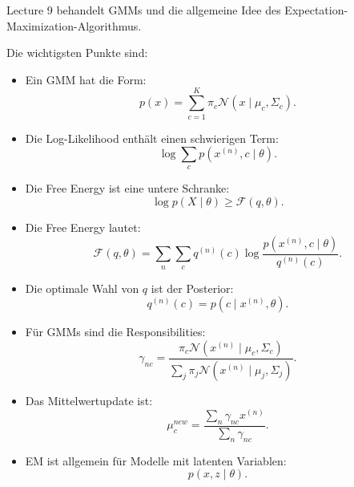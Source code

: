 \documentclass[11pt,a4paper]{scrartcl}
\begin{document}
\begin{answerbox}
    Lecture 9 behandelt GMMs und die allgemeine Idee des
    Expectation-Maximization-Algorithmus.

    Die wichtigsten Punkte sind:

    \begin{itemize}
        \item Ein GMM hat die Form:
        \[
            p(x)
            =
            \sum_{c=1}^{K}
            \pi_c
            \mathcal{N}(x\mid \mu_c,\Sigma_c).
        \]

        \item Die Log-Likelihood enthält einen schwierigen Term:
        \[
            \log
            \sum_c
            p(x^{(n)},c\mid \theta).
        \]

        \item Die Free Energy ist eine untere Schranke:
        \[
            \log p(X\mid \theta)
            \geq
            \mathcal{F}(q,\theta).
        \]

        \item Die Free Energy lautet:
        \[
            \mathcal{F}(q,\theta)
            =
            \sum_n
            \sum_c
            q^{(n)}(c)
            \log
            \frac{
                p(x^{(n)},c\mid \theta)
            }{
                q^{(n)}(c)
            }.
        \]

        \item Die optimale Wahl von \(q\) ist der Posterior:
        \[
            q^{(n)}(c)
            =
            p(c\mid x^{(n)},\theta).
        \]

        \item Für GMMs sind die Responsibilities:
        \[
            \gamma_{nc}
            =
            \frac{
                \pi_c
                \mathcal{N}(x^{(n)}\mid \mu_c,\Sigma_c)
            }{
                \sum_j
                \pi_j
                \mathcal{N}(x^{(n)}\mid \mu_j,\Sigma_j)
            }.
        \]

        \item Das Mittelwertupdate ist:
        \[
            \mu_c^{new}
            =
            \frac{
                \sum_n
                \gamma_{nc}x^{(n)}
            }{
                \sum_n
                \gamma_{nc}
            }.
        \]

        \item EM ist allgemein für Modelle mit latenten Variablen:
        \[
            p(x,z\mid \theta).
        \]


\end{itemize}
\end{answerbox}
\end{document}
